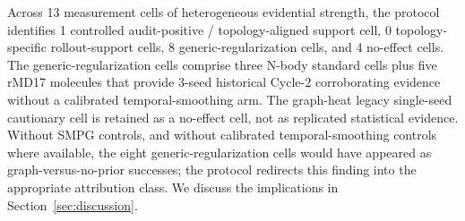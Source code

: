 \documentclass[preprint,12pt]{elsarticle}
\begin{document}
Across 13 measurement cells of heterogeneous evidential strength, the 
protocol identifies 1 controlled audit-positive / topology-aligned 
support cell, 0 topology-specific rollout-support cells, 8 
generic-regularization cells, and 4 no-effect cells. The 
generic-regularization cells comprise three N-body standard cells plus 
five rMD17 molecules that provide 3-seed historical Cycle-2 
corroborating evidence without a calibrated temporal-smoothing arm. The 
graph-heat legacy single-seed cautionary cell is retained as a 
no-effect cell, not as replicated statistical evidence. Without SMPG controls, and without calibrated 
temporal-smoothing controls where available, the eight 
generic-regularization cells would have appeared as 
graph-versus-no-prior successes; the protocol redirects this finding 
into the appropriate attribution class. We discuss the implications 
in Section~\ref{sec:discussion}.
\end{document}
